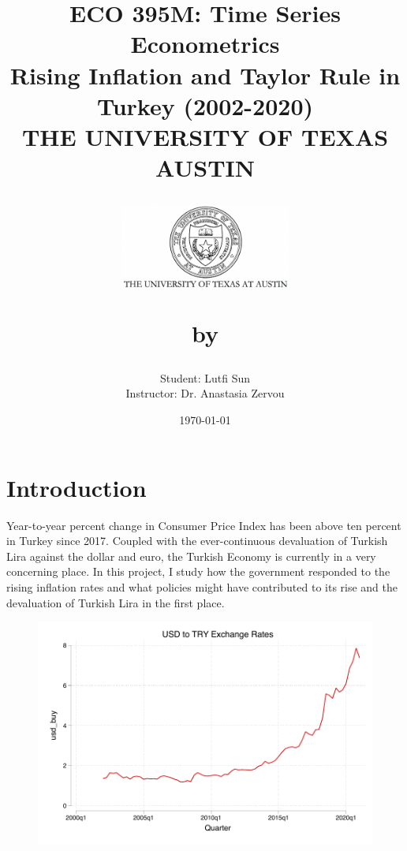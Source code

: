 \documentclass{article}
\begin{document}
\title{\bf {\large ECO 395M: Time Series Econometrics}\vspace{1cm} \\
{\Large Rising Inflation and Taylor Rule in Turkey (2002-2020)}
\vspace{2cm}\\
{\Large THE UNIVERSITY OF TEXAS AUSTIN}\\
\begin{figure}[h!]
\centering \includegraphics[width=2.2in]{ut1.png}
\end{figure}
by
}

\author{Student: Lutfi Sun \\ 
        Instructor: Dr. Anastasia Zervou \\ 
        }

\date{\today}

\linespread{1.8}

\maketitle
\newpage
\tableofcontents
\newpage

\section{Introduction}

    Year-to-year percent change in Consumer Price Index has been above ten percent in Turkey since 2017. Coupled with the ever-continuous devaluation of Turkish Lira against the dollar and euro, the Turkish Economy is currently in a very concerning place. In this project, I study how the government responded to the rising inflation rates and what policies might have contributed to its rise and the devaluation of Turkish Lira in the first place.

    \begin{figure}[H]
        \centering
        \includegraphics[width=\linewidth-1cm]{turkey_taylor/usd_fx_rates.pdf}
    \end{figure}
\end{document}
